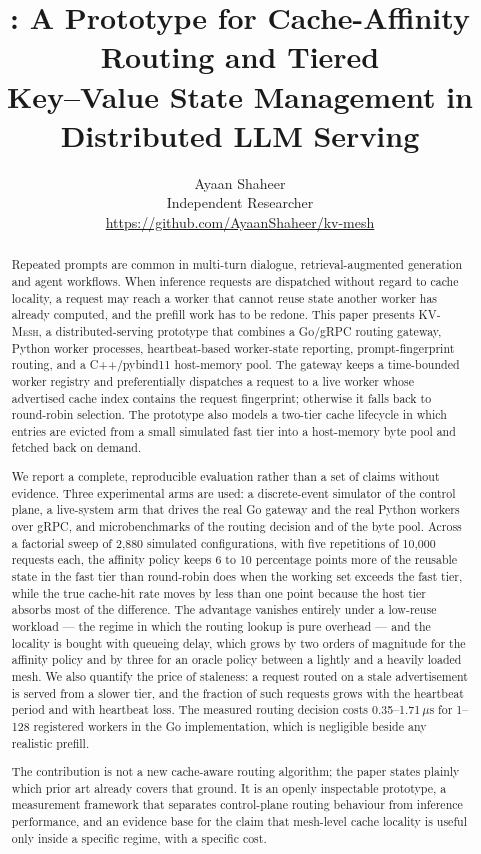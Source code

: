 \documentclass[10pt,twocolumn]{article}
\title{\kvmesh: A Prototype for Cache-Affinity Routing and Tiered\\
Key--Value State Management in Distributed LLM Serving}
\author{Ayaan Shaheer\\
Independent Researcher\\
{\small\url{https://github.com/AyaanShaheer/kv-mesh}}}
\date{}
\newcommand{\kvmesh}{\textsc{KV-Mesh}}
\begin{document}
\maketitle

\begin{abstract}
Repeated prompts are common in multi-turn dialogue, retrieval-augmented
generation and agent workflows. When inference requests are dispatched without
regard to cache locality, a request may reach a worker that cannot reuse state
another worker has already computed, and the prefill work has to be redone.
This paper presents \kvmesh, a distributed-serving prototype that combines a
Go/gRPC routing gateway, Python worker processes, heartbeat-based worker-state
reporting, prompt-fingerprint routing, and a C++/pybind11 host-memory pool.
The gateway keeps a time-bounded worker registry and preferentially dispatches a
request to a live worker whose advertised cache index contains the request
fingerprint; otherwise it falls back to round-robin selection. The prototype
also models a two-tier cache lifecycle in which entries are evicted from a
small simulated fast tier into a host-memory byte pool and fetched back on
demand.

We report a complete, reproducible evaluation rather than a set of claims
without evidence. Three experimental arms are used: a discrete-event simulator
of the control plane, a live-system arm that drives the real Go gateway and
the real Python workers over gRPC, and microbenchmarks of the routing decision
and of the byte pool. Across a factorial sweep of 2{,}880 simulated
configurations, with five repetitions of 10{,}000 requests each, the affinity
policy keeps 6 to 10 percentage points more of the reusable state in the
fast tier than round-robin does when the working set exceeds the fast tier,
while the true cache-hit rate moves by less than one point because the host
tier absorbs most of the difference. The advantage vanishes entirely under a
low-reuse workload --- the regime in which the routing lookup is pure
overhead --- and the locality is bought with queueing delay, which grows by
two orders of magnitude for the affinity policy and by three for an oracle
policy between a lightly and a heavily loaded mesh. We
also quantify the price of staleness: a request routed on a stale
advertisement is served from a slower tier, and the fraction of such requests
grows with the heartbeat period and with heartbeat loss. The measured
routing decision costs 0.35--1.71\,$\mu$s for 1--128 registered workers in
the Go implementation, which is negligible beside any realistic prefill.

The contribution is not a new cache-aware routing algorithm; the paper states
plainly which prior art already covers that ground. It is an openly
inspectable prototype, a measurement framework that separates control-plane
routing behaviour from inference performance, and an evidence base for the
claim that mesh-level cache locality is useful only inside a specific regime,
with a specific cost.
\end{abstract}
\end{document}
